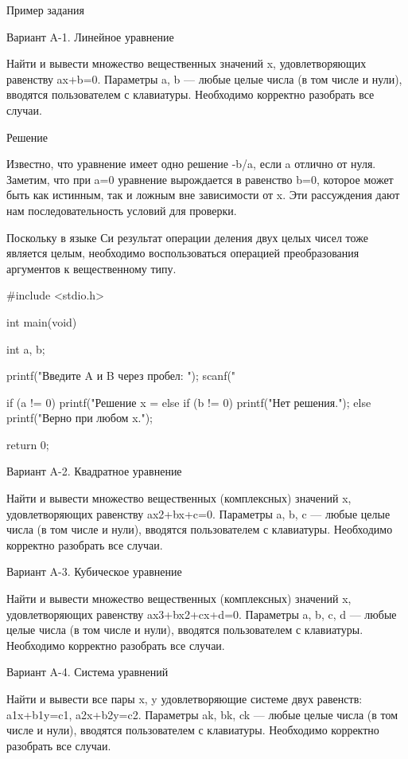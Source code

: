 Пример задания

Вариант A-1. Линейное уравнение

Найти и вывести множество вещественных значений x, удовлетворяющих равенству
ax+b=0. Параметры a, b — любые целые числа (в том числе и нули), вводятся
пользователем с клавиатуры. Необходимо корректно разобрать все случаи.

Решение

Известно, что уравнение имеет одно решение -b/a, если a отлично от нуля.
Заметим, что при a=0 уравнение вырождается в равенство b=0, которое может быть
как истинным, так и ложным вне зависимости от x. Эти рассуждения дают нам
последовательность условий для проверки.

Поскольку в языке Си результат операции деления двух целых чисел тоже является
целым, необходимо воспользоваться операцией преобразования аргументов к
вещественному типу.

#include <stdio.h>

int main(void)
{
  int a, b;

  printf("Введите A и B через пробел: ");
  scanf("%

  if (a != 0)
    printf("Решение x = %
  else if (b != 0)
    printf("Нет решения.\n");
  else
    printf("Верно при любом x.\n");

  return 0;
}


Вариант A-2. Квадратное уравнение

Найти и вывести множество вещественных (комплексных) значений x,
удовлетворяющих равенству ax2+bx+c=0. Параметры a, b, c — любые целые числа (в
том числе и нули), вводятся пользователем с клавиатуры. Необходимо корректно
разобрать все случаи.


Вариант A-3. Кубическое уравнение

Найти и вывести множество вещественных (комплексных) значений x,
удовлетворяющих равенству ax3+bx2+cx+d=0. Параметры a, b, c, d — любые целые
числа (в том числе и нули), вводятся пользователем с клавиатуры. Необходимо
корректно разобрать все случаи.


Вариант A-4. Система уравнений

Найти и вывести все пары x, y удовлетворяющие системе двух равенств:
a1x+b1y=c1, a2x+b2y=c2. Параметры ak, bk, ck — любые целые числа (в том числе
и нули), вводятся пользователем с клавиатуры. Необходимо корректно разобрать
все случаи.

